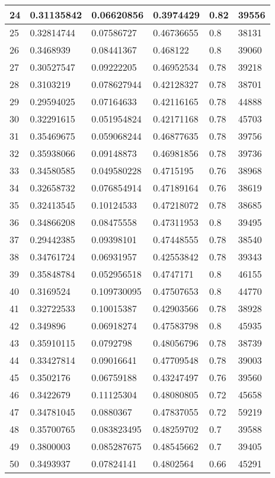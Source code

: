 \begin{longtable}{|l|l|l|l|l|l|}
24 & 0.31135842 & 0.06620856 & 0.3974429 & 0.82 & 39556 \\ \hline 
25 & 0.32814744 & 0.07586727 & 0.46736655 & 0.8 & 38131 \\ \hline 
26 & 0.3468939 & 0.08441367 & 0.468122 & 0.8 & 39060 \\ \hline 
27 & 0.30527547 & 0.09222205 & 0.46952534 & 0.78 & 39218 \\ \hline 
28 & 0.3103219 & 0.078627944 & 0.42128327 & 0.78 & 38701 \\ \hline 
29 & 0.29594025 & 0.07164633 & 0.42116165 & 0.78 & 44888 \\ \hline 
30 & 0.32291615 & 0.051954824 & 0.42171168 & 0.78 & 45703 \\ \hline 
31 & 0.35469675 & 0.059068244 & 0.46877635 & 0.78 & 39756 \\ \hline 
32 & 0.35938066 & 0.09148873 & 0.46981856 & 0.78 & 39736 \\ \hline 
33 & 0.34580585 & 0.049580228 & 0.4715195 & 0.76 & 38968 \\ \hline 
34 & 0.32658732 & 0.076854914 & 0.47189164 & 0.76 & 38619 \\ \hline 
35 & 0.32413545 & 0.10124533 & 0.47218072 & 0.78 & 38685 \\ \hline 
36 & 0.34866208 & 0.08475558 & 0.47311953 & 0.8 & 39495 \\ \hline 
37 & 0.29442385 & 0.09398101 & 0.47448555 & 0.78 & 38540 \\ \hline 
38 & 0.34761724 & 0.06931957 & 0.42553842 & 0.78 & 39343 \\ \hline 
39 & 0.35848784 & 0.052956518 & 0.4747171 & 0.8 & 46155 \\ \hline 
40 & 0.3169524 & 0.109730095 & 0.47507653 & 0.8 & 44770 \\ \hline 
41 & 0.32722533 & 0.10015387 & 0.42903566 & 0.78 & 38928 \\ \hline 
42 & 0.349896 & 0.06918274 & 0.47583798 & 0.8 & 45935 \\ \hline 
43 & 0.35910115 & 0.0792798 & 0.48056796 & 0.78 & 38739 \\ \hline 
44 & 0.33427814 & 0.09016641 & 0.47709548 & 0.78 & 39003 \\ \hline 
45 & 0.3502176 & 0.06759188 & 0.43247497 & 0.76 & 39560 \\ \hline 
46 & 0.3422679 & 0.11125304 & 0.48080805 & 0.72 & 45658 \\ \hline 
47 & 0.34781045 & 0.0880367 & 0.47837055 & 0.72 & 59219 \\ \hline 
48 & 0.35700765 & 0.083823495 & 0.48259702 & 0.7 & 39588 \\ \hline 
49 & 0.3800003 & 0.085287675 & 0.48545662 & 0.7 & 39405 \\ \hline 
50 & 0.3493937 & 0.07824141 & 0.4802564 & 0.66 & 45291 \\ \hline 
\end{longtable}